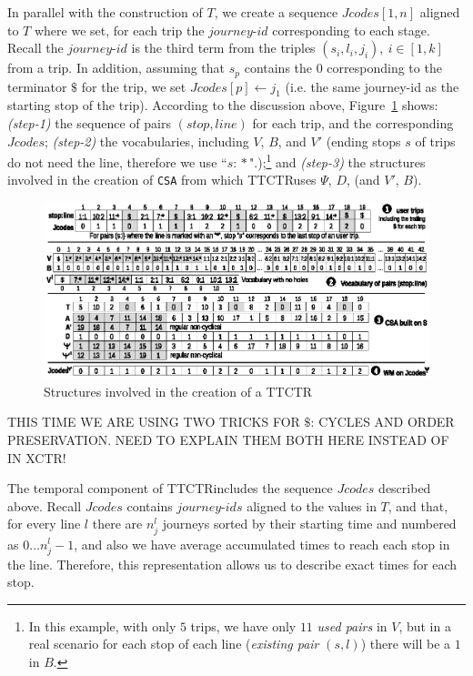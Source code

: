 \documentclass[runningheads]{llncs}
\newcommand{\ctr}{XCTR}
\newcommand{\ttctr}{TTCTR}
\begin{document}
In parallel with the construction of $T$, we create a sequence $Jcodes[1,n]$ aligned to $T$ where we set, for each trip the $journey$-$id$ corresponding to each stage. Recall the $journey$-$id$ is the third term from the triples $(s_i,l_i,j_i),~i\in[1,k]$ from a trip. In addition, assuming that $s_p$ contains the $0$ corresponding to the terminator $\$$ for the trip, we set $Jcodes[p]\leftarrow j_1$ (i.e. the same journey-id as  the starting stop of the trip). According to the discussion above, Figure~\ref{fig:ttctr} shows:
{\em (step-1)} the sequence of pairs $(stop,line)$ for each trip, and the corresponding $Jcodes$; {\em (step-2)} the vocabularies, including $V$, $B$, and $V'$ (ending stops $s$ of trips do not need the line, therefore we use ``$s\!:\!*$".);\footnote{In this example, with only $5$ trips,  we have only $11$ {\em used pairs} in $V$, but in a real scenario for each stop of each line ({\em existing pair} $(s,l)$) 
	there will be a $1$ in $B$.} 
and {\em (step-3)} the structures involved in the creation of \texttt{CSA} from which \ttctr uses $\Psi$, $D$, (and $V'$, $B$).

\begin{figure}[tbhp]
    \includegraphics[width=1.00\textwidth]{ttctr2019.eps}
	\caption{Structures involved in the creation of a \ttctr}
	\label{fig:ttctr}
\end{figure}

THIS TIME WE ARE USING TWO TRICKS FOR $\$$: CYCLES AND ORDER PRESERVATION. NEED TO EXPLAIN THEM BOTH HERE INSTEAD OF IN \ctr!

The temporal component of \ttctr includes the sequence $Jcodes$ described above. Recall $Jcodes$ contains $journey$-$ids$ aligned to the values in $T$, and that, for every line $l$ there are $n_j^l$ journeys sorted by their starting time and numbered as $0\dots n_j^l-1$, and also we have average accumulated times to reach each stop in the line. Therefore, this representation allows us to describe exact times for each stop.
\end{document}
